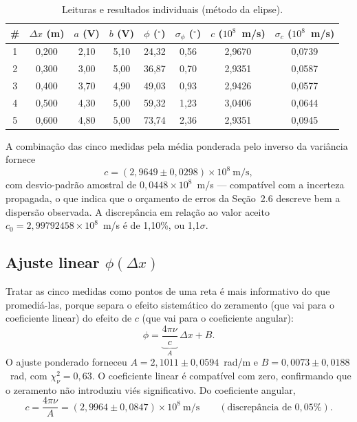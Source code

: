 \documentclass[11pt,a4paper]{article}
\begin{document}
\begin{table}[H]\centering\small
\caption{Leituras e resultados individuais (método da elipse).}
\begin{tabular}{cccccccc}
\toprule
\# & $\Delta x$ (m) & $a$ (V) & $b$ (V) & $\phi$ ($^\circ$) &
$\sigma_\phi$ ($^\circ$) & $c$ ($10^{8}$~m/s) & $\sigma_c$ ($10^{8}$~m/s)\\
\midrule
1 & 0{,}200 & 2{,}10 & 5{,}10 & 24{,}32 & 0{,}56 & 2{,}9670 & 0{,}0739 \\
2 & 0{,}300 & 3{,}00 & 5{,}00 & 36{,}87 & 0{,}70 & 2{,}9351 & 0{,}0587 \\
3 & 0{,}400 & 3{,}70 & 4{,}90 & 49{,}03 & 0{,}93 & 2{,}9426 & 0{,}0577 \\
4 & 0{,}500 & 4{,}30 & 5{,}00 & 59{,}32 & 1{,}23 & 3{,}0406 & 0{,}0644 \\
5 & 0{,}600 & 4{,}80 & 5{,}00 & 73{,}74 & 2{,}36 & 2{,}9351 & 0{,}0945 \\
\bottomrule
\end{tabular}
\end{table}

A combinação das cinco medidas pela média ponderada pelo inverso da variância
fornece
\begin{equation}
c = (2{,}9649 \pm 0{,}0298)\times 10^{8}~\text{m/s},
\end{equation}
com desvio-padrão amostral de $0{,}0448\times10^{8}$~m/s --- compatível com a
incerteza propagada, o que indica que o orçamento de erros da
Seção~2.6 descreve bem a dispersão observada. A discrepância em relação ao
valor aceito $c_0 = 2{,}99792458\times10^{8}$~m/s é de 1{,}10\%, ou
1{,}1$\sigma$.

\subsection{Ajuste linear \texorpdfstring{$\phi(\Delta x)$}{phi(Dx)}}
Tratar as cinco medidas como pontos de uma reta é mais informativo do que
promediá-las, porque separa o efeito sistemático do zeramento (que vai para o
coeficiente linear) do efeito de $c$ (que vai para o coeficiente angular):
\begin{equation}
\phi = \underbrace{\frac{4\pi\nu}{c}}_{A}\,\Delta x + B .
\end{equation}
O ajuste ponderado forneceu $A = 2{,}1011 \pm 0{,}0594$~rad/m e
$B = 0{,}0073 \pm 0{,}0188$~rad, com $\chi^2_\nu = 0{,}63$. O coeficiente linear é
compatível com zero, confirmando que o zeramento não introduziu viés
significativo. Do coeficiente angular,
\begin{equation}
c = \frac{4\pi\nu}{A} = (2{,}9964 \pm 0{,}0847)\times10^{8}~\text{m/s}
\qquad (\text{discrepância de } 0{,}05\%).
\end{equation}
\end{document}
